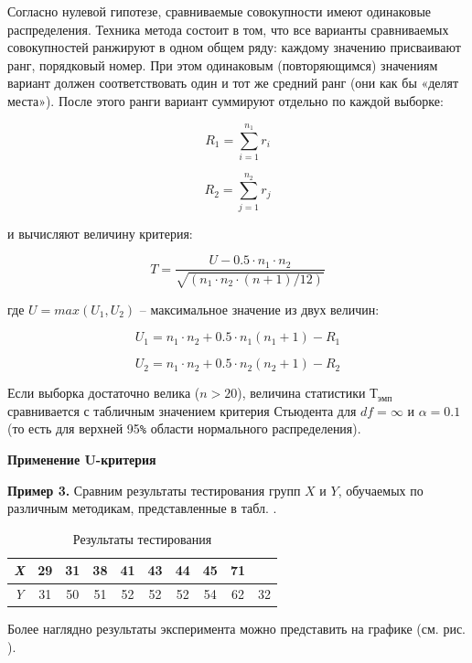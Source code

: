 \documentclass[12pt]{article}
\begin{document}
\medskip
Согласно нулевой гипотезе, сравниваемые совокупности имеют одинаковые распределения. Техника метода состоит в том, что все варианты сравниваемых совокупностей ранжируют в одном общем ряду: каждому значению присваивают ранг, порядковый номер. При этом одинаковым (повторяющимся) значениям вариант должен соответствовать один и тот же средний ранг (они как бы «делят места»). После этого ранги вариант суммируют отдельно по каждой выборке:

\begin{equation}
    R_1=\sum_{i=1}^{n_1} r_i
\end{equation}

\begin{equation}
    R_2=\sum_{j=1}^{n_2} r_j
\end{equation}

и вычисляют величину критерия:

\begin{equation}
    T =\frac{U - 0.5 \cdot n_1 \cdot n_2}{\sqrt{(n_1 \cdot n_2 \cdot (n+1)/12)}}
\end{equation}

где $U = max(U_1, U_2)$ – максимальное значение из двух величин:

\begin{equation}
    U_1 = n_1 \cdot n_2 + 0.5 \cdot n_1(n_1+1)-R_1
\end{equation}

\begin{equation}
    U_2 = n_1 \cdot n_2 + 0.5 \cdot n_2(n_2+1)-R_2
\end{equation}
                                           
Если выборка достаточно велика ($n > 20$), величина статистики $Т_{эмп}$ сравнивается с табличным значением критерия Стьюдента для $df = \infty$ и $\alpha = 0.1$ (то есть для верхней 95\verb!%! области нормального распределения).

\medskip
\textbf{Применение U-критерия}

\medskip
\textbf{Пример 3.} Сравним результаты тестирования групп $X$ и $Y$, обучаемых по различным методикам, представленные в табл. . 

\begin{table}[h]
    \centering
    \caption{Результаты тестирования}
    \bigskip
    \begin{tabular}{|c|c|c|c|c|c|c|c|c|c|} \hline
         \textit{X} &29&31&38&41&43&44&45&71&  \\ \hline
         \textit{Y} &31&50&51&52&52&52&54&62&32  \\  \hline
    \end{tabular}
\end{table}
Более наглядно результаты эксперимента можно представить на графике (см. рис. ).
 
\end{document}

